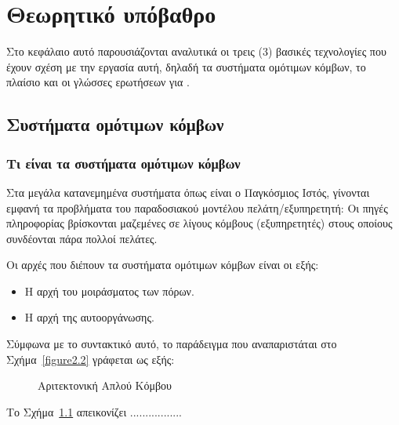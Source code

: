 \chapter{Θεωρητικό υπόβαθρο}
Στο κεφάλαιο αυτό παρουσιάζονται  αναλυτικά οι τρεις (3)
βασικές τεχνολογίες που έχουν σχέση με την εργασία αυτή, δηλαδή τα
συστήματα ομότιμων κόμβων, το πλαίσιο  και οι γλώσσες
ερωτήσεων για .

\section{Συστήματα ομότιμων κόμβων}
\subsection{Τι είναι τα συστήματα ομότιμων κόμβων}
Στα μεγάλα κατανεμημένα συστήματα όπως είναι ο Παγκόσμιος Ιστός,
γίνονται εμφανή τα προβλήματα του παραδοσιακού μοντέλου
πελάτη/εξυπηρετητή: Οι πηγές πληροφορίας βρίσκονται μαζεμένες σε
λίγους κόμβους (εξυπηρετητές) στους οποίους συνδέονται πάρα πολλοί
πελάτες.

Οι αρχές που διέπουν τα συστήματα ομότιμων κόμβων είναι οι εξής:
\begin{itemize}
\item Η αρχή του μοιράσματος των πόρων.
\item Η αρχή της αυτοοργάνωσης.
\end{itemize}

Σύμφωνα με το συντακτικό αυτό, το παράδειγμα που αναπαριστάται στο
Σχήμα~\ref{figure2.2} γράφεται ως εξής: 

\begin{figure}[!ht] \center\leavevmode
\epsfxsize=12cm \epsfysize=14cm
 \caption{Αριτεκτονική Απλού
Κόμβου}\label{figure4.1}
\end{figure}

Το Σχήμα~\ref{figure4.1} απεικονίζει .................
